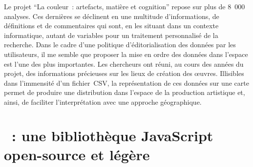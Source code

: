 Le projet \enquote{La couleur~: artefacts, matière et cognition} repose sur plus de 8~000 analyses. Ces dernières se déclinent en une multitude d’informations, de définitions et de commentaires qui sont, en les situant dans un contexte informatique, autant de variables pour un traitement personnalisé de la recherche. Dans le cadre d’une politique d’éditorialisation des données par les utilisateurs, il me semble que proposer la mise en ordre des données dans l’espace est l’une des plus importantes. Les chercheurs ont réuni, au cours des années du projet, des informations précieuses sur les lieux de création des œuvres. Illisibles dans l’immensité d’un fichier~CSV, la représentation de ces données sur une carte permet de produire une distribution dans l’espace de la production artistique et, ainsi, de faciliter l’interprétation avec une approche géographique.\newpage

\section{~: une bibliothèque JavaScript open-source et légère}

